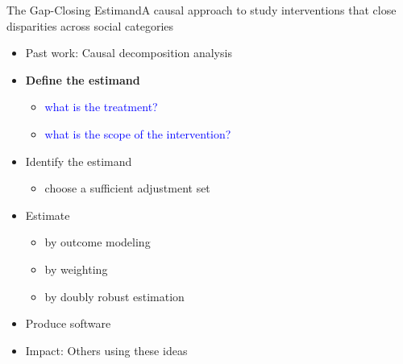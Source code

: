 \documentclass{beamer}
\newcommand\bblue[1]{{\color{blue}\textbf{#1}}}
\begin{document}
{\begin{frame}{The Gap-Closing Estimand}{A causal approach to study interventions that close disparities across social categories}
	\begin{itemize}
		\item Past work: Causal decomposition analysis
		\item \bblue{Define the estimand}
		\begin{itemize}
			\item \textcolor{blue}{what is the treatment?}
			\item \textcolor{blue}{what is the scope of the intervention?}
		\end{itemize}
		\item Identify the estimand
		\begin{itemize}
			\item choose a sufficient adjustment set
		\end{itemize}
		\item Estimate
		\begin{itemize}
			\item by outcome modeling
			\item by weighting
			\item by doubly robust estimation
		\end{itemize}
		\item Produce software
		\item Impact: Others using these ideas
	\end{itemize}
\end{frame}


}
\end{document}
